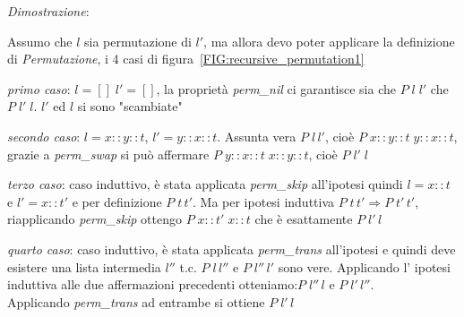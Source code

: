 \documentclass[a4paper]{article}
\newenvironment{dimostrazione}{\textit{Dimostrazione}:\begin{adjustwidth}{1cm}{}}{\end{adjustwidth}}
\begin{document}
\begin{dimostrazione}
	Assumo che $l$ sia permutazione di $l'$, ma allora devo poter applicare la definizione di \textit{Permutazione}, i 4 casi di figura~\ref{FIG:recursive_permutation1} 


	\textit{primo caso}: $l=[] \; l'=[]$, la proprietà \emph{perm\_nil} ci garantisce sia che $P \;l \; l'$ che $P \; l'\; l$. $l'$ ed $l$ si sono "scambiate"


	\textit{secondo caso}: $l = x::y::t$, $l'= y::x::t$. Assunta vera $P \; l \, l'$, cioè $P \; x::y::t \; y::x::t$, grazie a \emph{perm\_swap} si può affermare $P \; y::x::t \; x::y::t$, cioè $P \; l' \; l$

	\textit{terzo caso}: caso induttivo, è stata applicata \textit{perm\_skip} all'ipotesi quindi $l = x::t$ e $l' = x::t'$ e per definizione $P \; t \, t'$.
	Ma per ipotesi induttiva $P \; t \, t' \Rightarrow P \; t' \, t'$, riapplicando \textit{perm\_skip} ottengo $P \; x::t' \; x::t$ che è esattamente $P \; l' \, l$

	\textit{quarto caso}: caso induttivo, è stata applicata \textit{perm\_trans} all'ipotesi e quindi deve esistere una lista intermedia $l''$ t.c. $P\; l\, l''$ e $P \; l''\, l'$ sono vere.
	Applicando l' ipotesi induttiva alle due affermazioni precedenti otteniamo:$P\; l''\, l$ e $P \; l'\, l''$.\\
	Applicando \textit{perm\_trans} ad entrambe si ottiene $P \; l' \, l$
\end{dimostrazione}
\end{document}
